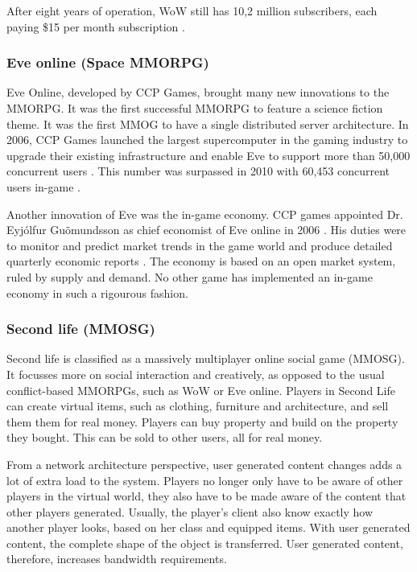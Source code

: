 After eight years of operation, WoW still has 10,2 million subscribers, each paying \$15 per month subscription \cite{wow_firstq_fin_results_2012}.

\subsubsection{Eve online (Space MMORPG)}

Eve Online, developed by CCP Games, brought many new innovations to the MMORPG. It was the first successful MMORPG to feature a science fiction theme. It was the first MMOG to have a single distributed server architecture. In 2006, CCP Games launched the largest supercomputer in the gaming industry to upgrade their existing infrastructure and enable Eve to support more than 50,000 concurrent users \cite{eve_launces_supcom}. This number was surpassed in 2010 with 60,453 concurrent users in-game \cite{eve_pcu}.

Another innovation of Eve was the in-game economy. CCP games appointed Dr. Eyj\'{o}lfur Gu\~{o}mundsson as chief economist of Eve online in 2006 \cite{eve_economist}. His duties were to monitor and predict market trends in the game world and produce detailed quarterly economic reports \cite{eve_econ_rep}.  The economy is based on an open market system, ruled by supply and demand. No other game has implemented an in-game economy in such a rigourous fashion.

\subsubsection{Second life (MMOSG)}

Second life is classified as a massively multiplayer online social game (MMOSG). It focusses more on social interaction and creatively, as opposed to the usual conflict-based MMORPGs, such as WoW or Eve online. Players in Second Life can create virtual items, such as clothing, furniture and architecture, and sell them them for real money. Players can buy property and build on the property they bought. This can be sold to other users, all for real money.

From a network architecture perspective, user generated content changes adds a lot of extra load to the system. Players no longer only have to be aware of other players in the virtual world, they also have to be made aware of the content that other players generated. Usually, the player's client also know exactly how another player looks, based on her class and equipped items. With user generated content, the complete shape of the object is transferred. User generated content, therefore, increases bandwidth requirements.

